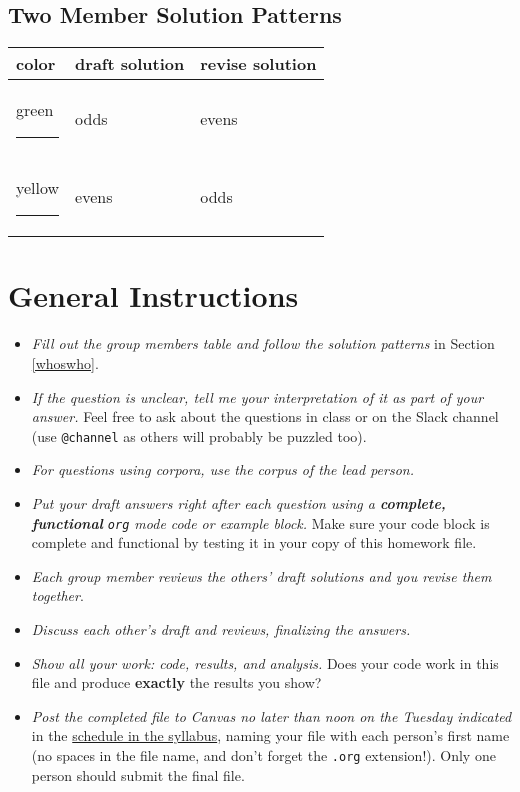 \documentclass[11pt]{article}
\begin{document}
\subsection{Two Member Solution Patterns}
\label{sec:org8953c0c}

\begin{center}
\begin{tabular}{lll}
color & draft solution & revise solution\\
\hline
green \color{green}\rule{5mm}{3mm} & odds & evens\\
yellow \color{yellow}\rule{5mm}{3mm} & evens & odds\\
\end{tabular}
\end{center}
\section{General Instructions}
\label{sec:org8b59493}


\begin{itemize}
\item \emph{Fill out the group members table and follow the solution patterns} in
Section \ref{whoswho}.

\item \emph{If the question is unclear, tell me your interpretation of it as part
of your answer.}  Feel free to ask about the questions in class or on
the Slack channel (use \texttt{@channel} as others will probably be puzzled
too).

\item \emph{For questions using corpora, use the corpus of the lead person.}

\item \emph{Put your draft answers right after each question using a \textbf{complete,
functional} \texttt{org} mode code or example block.} Make sure your code
block is complete and functional by testing it in your copy of this
homework file.

\item \emph{Each group member reviews the others' draft solutions and you revise them together}.

\item \emph{Discuss each other's draft and reviews, finalizing the answers.}

\item \emph{Show all your work: code, results, and analysis.}  Does your code
work in this file and produce \textbf{exactly} the results you show?

\item \emph{Post the completed file to Canvas no later than noon on the Tuesday
indicated} in the \href{../syllabus.org}{schedule in the syllabus}, naming your file with each
person's first name (no spaces in the file name, and don't forget the
\texttt{.org} extension!).  Only one person should submit the final file.
\end{itemize}
\end{document}

